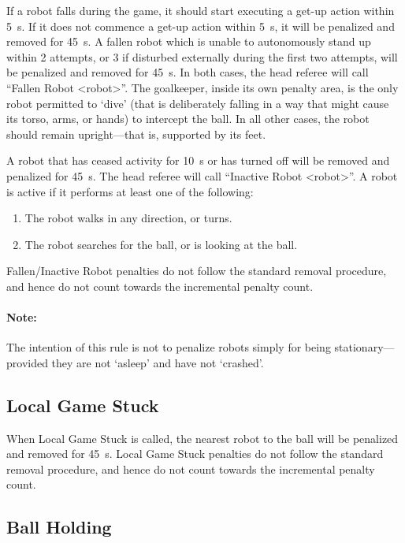 If a robot falls during the game, it should start executing a get-up action within \qty{5}{\second}.
If it does not commence a get-up action within \qty{5}{\second}, it will be penalized and removed for \qty{45}{\second}.
A fallen robot which is unable to autonomously stand up within 2 attempts, or 3 if disturbed externally during the first two attempts, will be penalized and removed for \qty{45}{\second}.
In both cases, the head referee will call ``Fallen Robot  \textless robot\textgreater''.
The goalkeeper, inside its own penalty area, is the only robot permitted to `dive' (that is deliberately falling in a way that might cause its torso, arms, or hands) to intercept the ball.
In all other cases, the robot should remain upright---that is, supported by its feet.

A robot that has ceased activity for \qty{10}{\second} or has turned off will be removed and penalized for \qty{45}{\second}.
The head referee will call ``Inactive Robot \textless robot\textgreater''.
A robot is active if it performs at least one of the following:
\begin{enumerate}
  \item The robot walks in any direction, or turns.
  \item The robot searches for the ball, or is looking at the ball.
\end{enumerate}

Fallen/Inactive Robot penalties do not follow the standard removal procedure, and hence do not count towards the incremental penalty count.

\paragraph{Note:} The intention of this rule is not to penalize robots simply for being stationary---provided they are not `asleep' and have not `crashed'.

\subsection{Local Game Stuck}
\label{sec:pen_local_game_stuck}

When Local Game Stuck is called, the nearest robot to the ball will be penalized and removed for \qty{45}{\second}.
Local Game Stuck penalties do not follow the standard removal procedure, and hence do not count towards the incremental penalty count.

\subsection{Ball Holding}
\label{sec:ball_holding}

